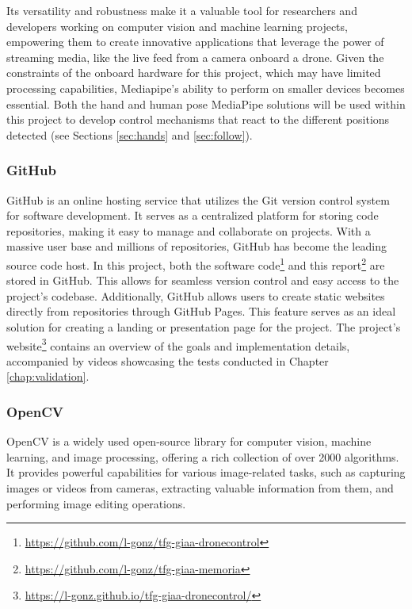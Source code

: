 Its versatility and robustness make it a valuable tool for researchers and developers working on computer vision and machine learning projects, empowering them to create innovative applications that leverage the power of streaming media, like the live feed from a camera onboard a drone.
Given the constraints of the onboard hardware for this project, which may have limited processing capabilities, Mediapipe's ability to perform on smaller devices becomes essential. Both the hand and human pose MediaPipe solutions will be used within this project to develop control mechanisms that react to the different positions detected (see Sections \ref{sec:hands} and \ref{sec:follow}).


\subsubsection{GitHub}
\label{subsec:github}

GitHub is an online hosting service that utilizes the Git version control system for software development. It serves as a centralized platform for storing code repositories, making it easy to manage and collaborate on projects. With a massive user base and millions of repositories, GitHub has become the leading source code host. 
In this project, both the software code\footnote{\url{https://github.com/l-gonz/tfg-giaa-dronecontrol}} and this report\footnote{\url{https://github.com/l-gonz/tfg-giaa-memoria}} are stored in GitHub. This allows for seamless version control and easy access to the project's codebase. 
Additionally, GitHub allows users to create static websites directly from repositories through GitHub Pages. This feature serves as an ideal solution for creating a landing or presentation page for the project. The project's website\footnote{\url{https://l-gonz.github.io/tfg-giaa-dronecontrol/}} contains an overview of the goals and implementation details, accompanied by videos showcasing the tests conducted in Chapter \ref{chap:validation}.


\subsubsection{OpenCV}
\label{subsec:opencv}

OpenCV is a widely used open-source library for computer vision, machine learning, and image processing, offering a rich collection of over 2000 algorithms. It provides powerful capabilities for various image-related tasks, such as capturing images or videos from cameras, extracting valuable information from them, and performing image editing operations.

